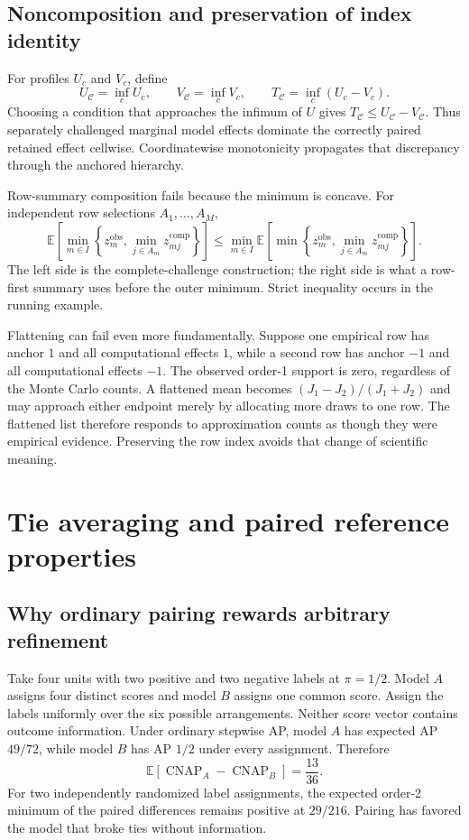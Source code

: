 \documentclass[11pt]{article}
\newcommand{\CNAP}{\operatorname{CNAP}}
\newcommand{\CSet}{\mathcal{C}}
\newcommand{\E}{\mathbb{E}}
\theoremstyle{remark}
\begin{document}
\subsection{Noncomposition and preservation of index identity}

For profiles $U_c$ and $V_c$, define
\[
U_\CSet=\inf_cU_c,
\qquad
V_\CSet=\inf_cV_c,
\qquad
T_\CSet=\inf_c(U_c-V_c).
\]
Choosing a condition that approaches the infimum of $U$ gives
$T_\CSet\leq U_\CSet-V_\CSet$. Thus separately challenged marginal model
effects dominate the correctly paired retained effect cellwise. Coordinatewise
monotonicity propagates that discrepancy through the anchored hierarchy.

Row-summary composition fails because the minimum is concave. For independent
row selections $A_1,\ldots,A_M$,
\[
\E\!\left[
\min_{m\in I}
\left\{
z_m^{\mathrm{obs}},
\min_{j\in A_m}z_{mj}^{\mathrm{comp}}
\right\}
\right]
\leq
\min_{m\in I}
\E\!\left[
\min\left\{
z_m^{\mathrm{obs}},
\min_{j\in A_m}z_{mj}^{\mathrm{comp}}
\right\}
\right].
\]
The left side is the complete-challenge construction; the right side is what a
row-first summary uses before the outer minimum. Strict inequality occurs in
the running example.

Flattening can fail even more fundamentally. Suppose one empirical row has
anchor $1$ and all computational effects $1$, while a second row has anchor
$-1$ and all computational effects $-1$. The observed order-1 support is zero,
regardless of the Monte Carlo counts. A flattened mean becomes
$(J_1-J_2)/(J_1+J_2)$ and may approach either endpoint merely by allocating
more draws to one row. The flattened list therefore responds to approximation
counts as though they were empirical evidence. Preserving the row index avoids
that change of scientific meaning.


\section{Tie averaging and paired reference properties}
\label{app:paired-proofs}

\subsection{Why ordinary pairing rewards arbitrary refinement}

Take four units with two positive and two negative labels at $\pi=1/2$.
Model $A$ assigns four distinct scores and model $B$ assigns one common score.
Assign the labels uniformly over the six possible arrangements. Neither score
vector contains outcome information. Under ordinary stepwise AP, model $A$ has
expected AP $49/72$, while model $B$ has AP $1/2$ under every assignment.
Therefore
\[
\E[\CNAP_A-\CNAP_B]=\frac{13}{36}.
\]
For two independently randomized label assignments, the expected order-2
minimum of the paired differences remains positive at $29/216$. Pairing has
favored the model that broke ties without information.
\end{document}
